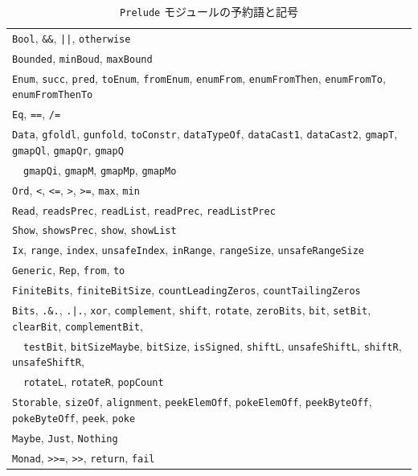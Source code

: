 \documentclass[a4paper,twocolumn]{jsbook}
\newcommand{\code}[1]{\texttt{#1}}
\begin{document}
\begin{table}
\caption{\code{Prelude} モジュールの予約語と記号}
\begin{center}
\begin{tabular}{||l||}
\hline
\code{Bool}, \code{\&\&}, \code{||}, \code{otherwise}\\
\code{Bounded}, \code{minBoud}, \code{maxBound}\\
\code{Enum}, \code{succ}, \code{pred}, \code{toEnum}, \code{fromEnum}, \code{enumFrom}, \code{enumFromThen}, \code{enumFromTo}, \code{enumFromThenTo}\\
\code{Eq}, \code{==}, \code{/=}\\
\code{Data}, \code{gfoldl}, \code{gunfold}, \code{toConstr}, \code{dataTypeOf}, \code{dataCast1}, \code{dataCast2}, \code{gmapT}, \code{gmapQl}, \code{gmapQr}, \code{gmapQ}\\
~~\code{gmapQi}, \code{gmapM}, \code{gmapMp}, \code{gmapMo}\\
\code{Ord}, \code{<}, \code{<=}, \code{>}, \code{>=}, \code{max}, \code{min}\\
\code{Read}, \code{readsPrec}, \code{readList}, \code{readPrec}, \code{readListPrec}\\
\code{Show}, \code{showsPrec}, \code{show}, \code{showList}\\
\code{Ix}, \code{range}, \code{index}, \code{unsafeIndex}, \code{inRange}, \code{rangeSize}, \code{unsafeRangeSize}\\
\code{Generic}, \code{Rep}, \code{from}, \code{to}\\
\code{FiniteBits}, \code{finiteBitSize}, \code{countLeadingZeros}, \code{countTailingZeros}\\
\code{Bits}, \code{.\&.}, \code{.|.}, \code{xor}, \code{complement}, \code{shift}, \code{rotate}, \code{zeroBits}, \code{bit}, \code{setBit}, \code{clearBit}, \code{complementBit},\\
~~\code{testBit}, \code{bitSizeMaybe}, \code{bitSize}, \code{isSigned}, \code{shiftL}, \code{unsafeShiftL}, \code{shiftR}, \code{unsafeShiftR},\\
~~\code{rotateL}, \code{rotateR}, \code{popCount}\\
\code{Storable}, \code{sizeOf}, \code{alignment}, \code{peekElemOff}, \code{pokeElemOff}, \code{peekByteOff}, \code{pokeByteOff}, \code{peek}, \code{poke}\\
\code{Maybe}, \code{Just}, \code{Nothing}\\
\code{Monad}, \code{>>=}, \code{>>}, \code{return}, \code{fail}\\

\end{tabular}
\end{center}
\end{table}
\end{document}

